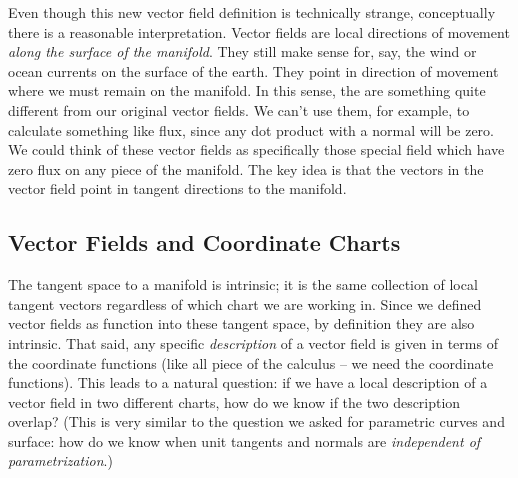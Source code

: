 \documentclass[fleqn,letterpaper]{report}
\begin{document}
Even though this new vector field definition is technically
strange, conceptually there is a reasonable interpretation.
Vector fields are local directions of movement \emph{along the
surface of the manifold}. They still make sense for, say, the
wind or ocean currents on the surface of the earth. They point
in direction of movement where we must remain on the manifold.
In this sense, the are something quite different from our
original vector fields. We can't use them, for example, to
calculate something like flux, since any dot product with a
normal will be zero. We could think of these vector fields as
specifically those special field which have zero flux on any
piece of the manifold. The key idea is that the vectors in the
vector field point in tangent directions to the manifold. 

\subsection{Vector Fields and Coordinate Charts} 
\label{vector-fields-coordinate-charts}

The tangent space to a manifold is intrinsic; it is the same
collection of local tangent vectors regardless of which chart
we are working in. Since we defined vector fields as function
into these tangent space, by definition they are also intrinsic.
That said, any specific \emph{description} of a vector field
is given in terms of the coordinate functions (like all piece
of the calculus -- we need the coordinate functions). This
leads to a natural question: if we have a local description of
a vector field in two different charts, how do we know if the
two description overlap? (This is very similar to the
question we asked for parametric curves and surface: how do we
know when unit tangents and normals are \emph{independent of
parametrization}.) 
\end{document}
